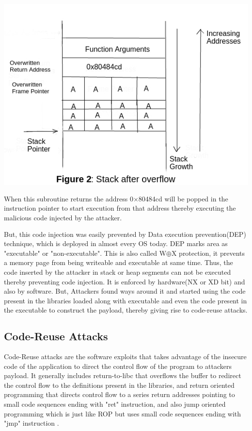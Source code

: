 \documentclass{article}
\begin{document}
\begin{multicols}{2}
	\
	\
	\
	
	\includegraphics[scale=.45]{stack_prog.jpg}	
	
	When this subroutine returns the address 0$\times$80484cd will be popped in the instruction pointer to start execution from that address thereby executing the malicious code injected by the attacker\cite{aleph}.
	
	But, this code injection was easily prevented by Data execution prevention(DEP) technique, which is deployed in almost every OS today. DEP marks area as "executable" or "non-executable". This is also called W$\oplus$X protection, it prevents a memory page from being writeable and executable at same time. Thus, the code inserted by the attacker in stack or heap segments can not be executed thereby preventing code injection. It is enforced by hardware(NX or XD bit) and also by software. But, Attackers found ways around it and started using the code present in the libraries loaded along with executable and even the code present in the executable to construct the payload, thereby giving rise to code-reuse attacks.
	
	\subsection{Code-Reuse Attacks}
	Code-Reuse attacks are the software exploits that takes advantage of the insecure code of the application to direct the control flow of the program to attackers payload. It generally includes return-to-libc that overflows the buffer to redirect the control flow to the definitions present in the libraries, and return oriented programming that directs control flow to a series return addresses pointing to small code sequences ending with "ret" instruction, and also jump oriented programming which is just like ROP but uses small code sequences ending with "jmp" instruction \cite{jop}.
	

\end{multicols}
\end{document}
